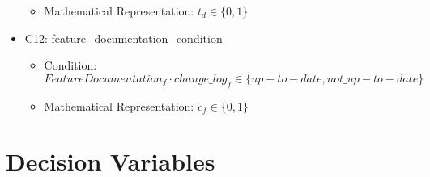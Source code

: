 \documentclass{article}
\begin{document}
\begin{itemize}
\begin{itemize}
            \item Mathematical Representation: $t_{d} \in \{0, 1\}$
        \end{itemize}
    \item C12: feature\_documentation\_condition
        \begin{itemize}
            \item Condition: $FeatureDocumentation_{f} \cdot change\_log_{f} \in \{up-to-date, not\_up-to-date\}$
            \item Mathematical Representation: $c_{f} \in \{0, 1\}$
        \end{itemize}
\end{itemize}

\section{Decision Variables}
\end{document}
